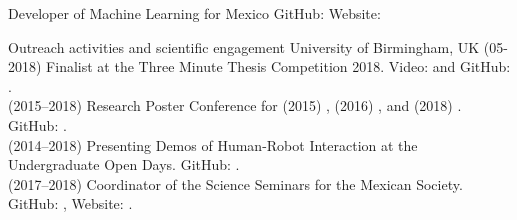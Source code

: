 \documentclass[10pt,a4paper,roman]{moderncv}
\begin{document}
{Developer of Machine Learning for Mexico}
{}
{GitHub: \href{https://github.com/ML4MX}{\faGithubAlt} }
{Website: \href{https://ml4mx.github.io/website/}{\faExternalLink}}
{}  %



{Outreach activities and scientific engagement}
{University of Birmingham, UK}
{}{}
{
(05-2018) Finalist at the Three Minute Thesis Competition 2018.
Video: \href{https://www.youtube.com/watch?v=07ewRYcS-0g}{\faYoutube} and 
GitHub: \href{https://github.com/mxochicale/3mt}{\faGithubAlt}. \\  
(2015--2018) Research Poster Conference for 
(2015) \href{https://github.com/mxochicale/PhD/blob/master/posters/Research_Poster_Conference_UoB/2015/poster/poster.pdf}{\faImage}, 
(2016) \href{https://github.com/mxochicale/PhD/blob/master/posters/Research_Poster_Conference_UoB/2016/poster/poster.pdf}{\faImage}, and  
(2018) \href{https://github.com/mxochicale/PhD/blob/master/posters/Research_Poster_Conference_UoB/2018/poster/main/map479-poster-uob2018.pdf}{\faImage}.
GitHub: \href{https://github.com/mxochicale/PhD/tree/master/posters/Research_Poster_Conference_UoB}{\faGithubAlt}. \\
(2014--2018) Presenting Demos of Human-Robot Interaction at the Undergraduate Open Days.
GitHub: \href{https://github.com/mxochicale/opendayuob-hridemo}{\faGithubAlt}. \\ 
(2017--2018) Coordinator of the Science Seminars for the Mexican Society. 
GitHub: \href{https://github.com/MexicanSocietyUoB}{\faGithubAlt}, 
Website: \href{https://mexicansocietyuob.github.io/seminars/}{\faExternalLink}. \\ 
}






%
\end{document}
